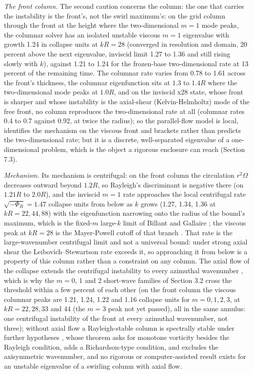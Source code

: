 \documentclass[11pt]{article}
\begin{document}
\emph{The front column.} The second caution concerns the column: the one that carries the instability is the front's, not the swirl maximum's: on the grid column through the front at the height where the two-dimensional $m = 1$ mode peaks, the columnar solver has an isolated unstable viscous $m = 1$ eigenvalue with growth 1.24 in collapse units at $k R = 28$ (converged in resolution and domain, 20 percent above the next eigenvalue, inviscid limit 1.27 to 1.36 and still rising slowly with $k$), against 1.21 to 1.24 for the frozen-base two-dimensional rate at 13 percent of the remaining time. The columnar rate varies from 0.78 to 1.61 across the front's thickness, the columnar eigenfunction sits at $1.3$ to $1.4 R$ where the two-dimensional mode peaks at $1.0 R$, and on the inviscid x28 state, whose front is sharper and whose instability is the axial-shear (Kelvin-Helmholtz) mode of the free front, no column reproduces the two-dimensional rate at all (columnar rates 0.4 to 0.7 against 0.92, at twice the radius); so the parallel-flow model is local, identifies the mechanism on the viscous front and brackets rather than predicts the two-dimensional rate; but it is a discrete, well-separated eigenvalue of a one-dimensional problem, which is the object a rigorous enclosure can reach (Section 7.3).

\emph{Mechanism.} Its mechanism is centrifugal: on the front column the circulation $r^2 \Omega$ decreases outward beyond $1.2 R$, so Rayleigh's discriminant is negative there (on $1.21 R$ to $2.0 R$), and the inviscid $m = 1$ rate approaches the local centrifugal rate $\sqrt{-\Phi_R} = 1.47$ collapse units from below as $k$ grows (1.27, 1.34, 1.36 at $k R = 22, 44, 88$) with the eigenfunction narrowing onto the radius of the bound's maximum, which is the fixed-$m$ large-$k$ limit of Billant and Gallaire \cite{BG05,BG13}; the viscous peak at $k R = 28$ is the Mayer-Powell cutoff of that branch \cite{MP92}. That rate is the large-wavenumber centrifugal limit and not a universal bound: under strong axial shear the Leibovich--Stewartson rate exceeds it, so approaching it from below is a property of this column rather than a constraint on any column. The axial flow of the collapse extends the centrifugal instability to every azimuthal wavenumber \cite{BG13}, which is why the $m = 0$, 1 and 2 short-wave families of Section 3.2 cross the threshold within a few percent of each other (on the front column the viscous columnar peaks are 1.21, 1.24, 1.22 and 1.16 collapse units for $m = 0, 1, 2, 3$, at $k R = 22, 28, 33$ and 44 (the $m = 3$ peak not yet passed), all in the same annulus: one centrifugal instability of the front at every azimuthal wavenumber, not three); without axial flow a Rayleigh-stable column is spectrally stable under further hypotheses \cite{GS20}, whose theorem asks for monotone vorticity besides the Rayleigh condition, adds a Richardson-type condition, and excludes the axisymmetric wavenumber, and no rigorous or computer-assisted result exists for an unstable eigenvalue of a swirling column with axial flow.
\end{document}
